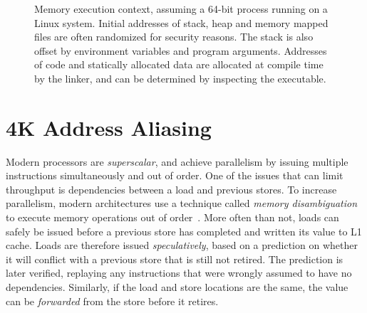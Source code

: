 \documentclass{acm_proc_article-sp}
\begin{document}
\begin{figure}
  \centering
  \caption{Memory execution context, assuming a 64-bit process running on a Linux system.
  Initial addresses of stack, heap and memory mapped files are often randomized for security reasons.
  The stack is also offset by environment variables and program arguments.
  Addresses of code and statically allocated data are allocated at compile time by the linker, and can be determined by inspecting the executable.}
  \label{fig:virtualmemory}
\end{figure}


\section{4K Address Aliasing}
\label{sec:aliasing}
Modern processors are \emph{superscalar}, and achieve parallelism by issuing multiple instructions simultaneously and out of order.
One of the issues that can limit throughput is dependencies between a load and previous stores.
To increase parallelism, modern architectures use a technique called \emph{memory disambiguation} to execute memory operations out of order~\cite{Intel:2006:InsideICM:SmartMemoryAccess}. 
More often than not, loads can safely be issued before a previous store has completed and written its value to L1 cache.
Loads are therefore issued \emph{speculatively}, based on a prediction on whether it will conflict with a previous store that is still not retired.
The prediction is later verified, replaying any instructions that were wrongly assumed to have no dependencies.
Similarly, if the load and store locations are the same, the value can be \emph{forwarded} from the store before it retires.
\end{document}
